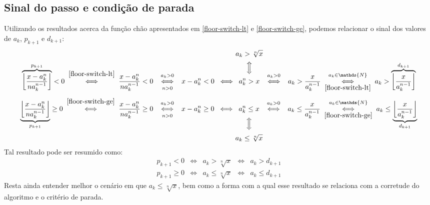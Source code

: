 \subsection*{Sinal do passo e condição de parada}

Utilizando os resultados acerca da função chão
apresentados em \eqref{floor-switch-lt} e \eqref{floor-switch-ge},
podemos relacionar o sinal dos valores de $a_k$, $p_{k+1}$ e $d_{k+1}$:
\[
  \overbrace{
    \left\lfloor \dfrac{x - a_k^n}{na_k^{n-1}} \right\rfloor
  }^{p_{k+1}} < 0
  \;\stackfirst{\eqref{floor-switch-lt}}{\iff}\;
  \dfrac{x - a_k^n}{na_k^{n-1}} < 0
  \;\stackfirst{a_k > 0}{
      \underset{n > 0\vphantom{\int}}{\iff}
    }\;
  x - a_k^n < 0
  \;\iff\;
  \overset{
    \mathclap{\substack{
      \displaystyle a_k > \sqrt[n]{x} \\[.5em]
      \displaystyle \Big\Updownarrow \\[.5em]
    }}
  }{a_k^n > x}
  \;\stackfirst{a_k > 0}{\iff}\;
  a_k > \dfrac{x}{a_k^{n-1}}
  \;\underset{\eqref{floor-switch-lt}}{
      \stackfirst{a_k \in \mathds{N}}{\iff}
    }\;
  a_k > \overbrace{
          \left\lfloor \dfrac{x}{a_k^{n-1}} \right\rfloor
        }^{d_{k+1}}
\]
\[
  \underbrace{
    \left\lfloor \dfrac{x - a_k^n}{na_k^{n-1}} \right\rfloor
  }_{p_{k+1}} \ge 0
  \;\stackfirst{\eqref{floor-switch-ge}}{\iff}\;
  \dfrac{x - a_k^n}{na_k^{n-1}} \ge 0
  \;\stackfirst{a_k > 0}{
      \underset{n > 0\vphantom{\int}}{\iff}
    }\;
  x - a_k^n \ge 0
  \;\iff\;
  \underset{
    \mathclap{\substack{\\[.4em]
      \displaystyle \Big\Updownarrow \\[.5em]
      \displaystyle a_k \le \sqrt[n]{x}
    }}
  }{a_k^n \le x}
  \;\stackfirst{a_k > 0}{\iff}\;
  a_k \le \dfrac{x}{a_k^{n-1}}
  \;\underset{\eqref{floor-switch-ge}}{
      \stackfirst{a_k \in \mathds{N}}{\iff}
    }\;
  a_k \le \underbrace{
            \left\lfloor \dfrac{x}{a_k^{n-1}} \right\rfloor
          }_{d_{k+1}}
\]
Tal resultado pode ser resumido como:
\begin{equation}
  \begin{array}{lcccr}
    p_{k+1}   < 0 &\iff& a_k   > \sqrt[n]{x} &\iff& a_k   > d_{k+1} \\
    p_{k+1} \ge 0 &\iff& a_k \le \sqrt[n]{x} &\iff& a_k \le d_{k+1}
  \end{array}
\end{equation}
Resta ainda entender melhor o cenário em que $a_k \le \sqrt[n]{x}$,
bem como a forma com a qual esse resultado
se relaciona com a corretude do algoritmo e o critério de parada.

